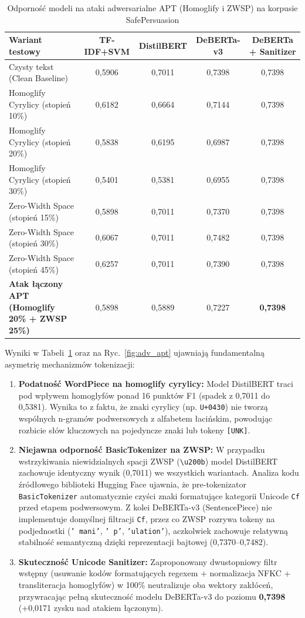 \documentclass[12pt,a4paper,twoside]{report}
\begin{document}
\begin{table}[H]\centering
\small
\caption{Odporność modeli na ataki adwersarialne APT (Homoglify i ZWSP) na korpusie SafePersuasion}\label{tab:e1_apt}
\begin{tabularx}{\textwidth}{>{\raggedright\arraybackslash}X c c c c}\toprule
\textbf{Wariant testowy} & \textbf{TF-IDF+SVM} & \textbf{DistilBERT} & \textbf{DeBERTa-v3} & \textbf{DeBERTa + Sanitizer} \\\midrule
Czysty tekst (Clean Baseline) & 0,5906 & 0,7011 & 0,7398 & 0,7398 \\
Homoglify Cyrylicy (stopień 10\%) & 0,6182 & 0,6664 & 0,7144 & 0,7398 \\
Homoglify Cyrylicy (stopień 20\%) & 0,5838 & 0,6195 & 0,6987 & 0,7398 \\
Homoglify Cyrylicy (stopień 30\%) & 0,5401 & 0,5381 & 0,6955 & 0,7398 \\\midrule
Zero-Width Space (stopień 15\%) & 0,5898 & 0,7011 & 0,7370 & 0,7398 \\
Zero-Width Space (stopień 30\%) & 0,6067 & 0,7011 & 0,7482 & 0,7398 \\
Zero-Width Space (stopień 45\%) & 0,6257 & 0,7011 & 0,7390 & 0,7398 \\\midrule
\textbf{Atak łączony APT (Homoglify 20\% + ZWSP 25\%)} & 0,5898 & 0,5889 & 0,7227 & \textbf{0,7398} \\
\bottomrule\end{tabularx}
\end{table}

Wyniki w Tabeli~\ref{tab:e1_apt} oraz na Ryc.~\ref{fig:adv_apt} ujawniają fundamentalną asymetrię mechanizmów tokenizacji:
\begin{enumerate}[leftmargin=*]
  \item \textbf{Podatność WordPiece na homoglify cyrylicy:} Model DistilBERT traci pod wpływem homoglyfów ponad 16 punktów F1 (spadek z 0,7011 do 0,5381). Wynika to z faktu, że znaki cyrylicy (np. \texttt{U+0430}) nie tworzą wspólnych n-gramów podwersowych z alfabetem łacińskim, powodując rozbicie słów kluczowych na pojedyncze znaki lub tokeny \texttt{[UNK]}.
  \item \textbf{Niejawna odporność BasicTokenizer na ZWSP:} W przypadku wstrzykiwania niewidzialnych spacji ZWSP (\texttt{\textbackslash u200b}) model DistilBERT zachowuje identyczny wynik (0,7011) we wszystkich wariantach. Analiza kodu źródłowego biblioteki Hugging Face ujawnia, że pre-tokenizator \texttt{BasicTokenizer} automatycznie czyści znaki formatujące kategorii Unicode \texttt{Cf} przed etapem podwersowym. Z kolei DeBERTa-v3 (SentencePiece) nie implementuje domyślnej filtracji \texttt{Cf}, przez co ZWSP rozrywa tokeny na podjednostki (\texttt{' mani'}, \texttt{' p'}, \texttt{'ulation'}), aczkolwiek zachowuje relatywną stabilność semantyczną dzięki reprezentacji bajtowej (0,7370--0,7482).
  \item \textbf{Skuteczność Unicode Sanitizer:} Zaproponowany dwustopniowy filtr wstępny (usuwanie kodów formatujących regexem + normalizacja NFKC + transliteracja homoglyfów) w 100\% neutralizuje oba wektory zakłóceń, przywracając pełną skuteczność modelu DeBERTa-v3 do poziomu \textbf{0,7398} (+0,0171 zysku nad atakiem łączonym).
\end{enumerate}
\end{document}
